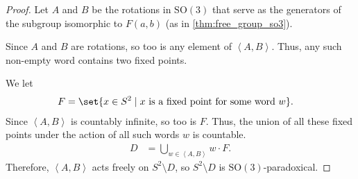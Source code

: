 \begin{proof}
  Let $A$ and $B$ be the rotations in $\text{SO}(3)$ that serve as the generators of the subgroup isomorphic to $F(a,b)$ (as in \ref{thm:free_group_so3}).\newline

  Since $A$ and $B$ are rotations, so too is any element of $\left\langle A,B \right\rangle$. Thus, any such non-empty word contains two fixed points.\newline

  We let
  \begin{align*}
    F &= \set{x\in S^{2}\mid x\text{ is a fixed point for some word }w}.
  \end{align*}
  Since $\left\langle A,B \right\rangle$ is countably infinite, so too is $F$. Thus, the union of all these fixed points under the action of all such words $w$ is countable.
  \begin{align*}
    D &= \bigcup_{w\in \left\langle A,B \right\rangle} w\cdot F.
  \end{align*}
  Therefore, $\left\langle A,B \right\rangle$ acts freely on $S^{2}\setminus D$, so $S^{2}\setminus D$ is $\text{SO}(3)$-paradoxical.
\end{proof}

